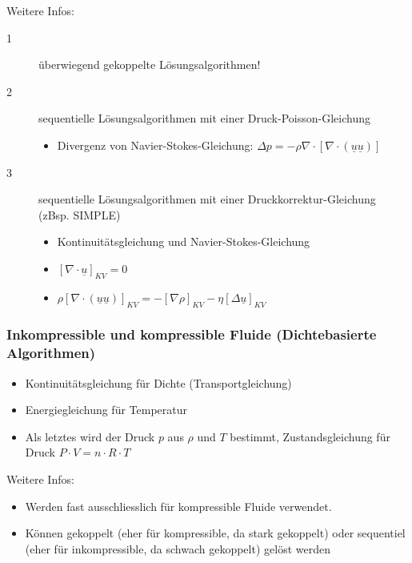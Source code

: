 \documentclass[a4paper]{scrartcl}
\begin{document}
Weitere Infos:
\begin{description}

  \item[1] überwiegend gekoppelte Lösungsalgorithmen!
  \item[2] sequentielle Lösungsalgorithmen mit einer Druck-Poisson-Gleichung
  \begin{itemize}
  	\item Divergenz von Navier-Stokes-Gleichung: $\Delta p = -\rho \nabla \cdot
  	[\nabla \cdot (\underline u \underline u)]$
  \end{itemize}
  \item[3] sequentielle Lösungsalgorithmen mit einer Druckkorrektur-Gleichung
  (zBsp. SIMPLE)
  \begin{itemize}
    \item Kontinuitätsgleichung und Navier-Stokes-Gleichung
    \item $[\nabla \cdot \underline u]_{KV} = 0$
    \item $\rho [\nabla \cdot (\underline u \underline u)]_{KV} = - [\nabla
    \rho]_{KV} - \eta [\Delta \underline u]_{KV}$
  \end{itemize}
\end{description}

\subsubsection{Inkompressible und kompressible Fluide (Dichtebasierte
Algorithmen)}
\begin{itemize}
  \item Kontinuitätsgleichung für Dichte (Transportgleichung)
  \item Energiegleichung für Temperatur
  \item Als letztes wird der Druck $p$ aus $\rho$ und $T$ bestimmt,
  Zustandsgleichung für Druck $P \cdot V = n \cdot R \cdot T$
\end{itemize}

Weitere Infos:\\
\begin{itemize}
  \item Werden fast ausschliesslich für kompressible Fluide verwendet.\\
  \item Können gekoppelt (eher für kompressible, da stark gekoppelt) oder
  sequentiel (eher für inkompressible, da schwach gekoppelt) gelöst werden
\end{itemize}
\end{document}
